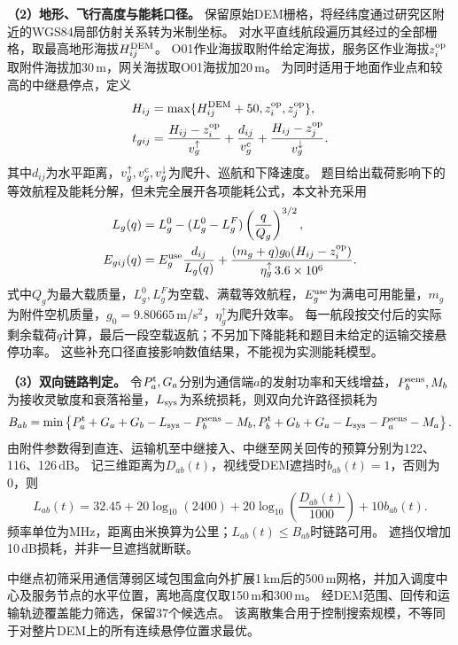 \textbf{（2）地形、飞行高度与能耗口径。}
保留原始DEM栅格，将经纬度通过研究区附近的WGS84局部仿射关系转为米制坐标。
对水平直线航段遍历其经过的全部栅格，取最高地形海拔$H^{\rm DEM}_{ij}$。
O01作业海拔取附件给定海拔，服务区作业海拔$z_i^{\rm op}$取附件海拔加30\,m，网关海拔取O01海拔加20\,m。
为同时适用于地面作业点和较高的中继悬停点，定义
\begin{align}
  H_{ij}&=\max\{H^{\rm DEM}_{ij}+50,z_i^{\rm op},z_j^{\rm op}\},
  \label{eq:q3:height}\\
  t_{gij}&=\frac{H_{ij}-z_i^{\rm op}}{v_g^{\uparrow}}
           +\frac{d_{ij}}{v_g^{\rm c}}
           +\frac{H_{ij}-z_j^{\rm op}}{v_g^{\downarrow}}.
  \label{eq:q3:flight-time}
\end{align}
其中$d_{ij}$为水平距离，$v_g^{\uparrow},v_g^{\rm c},v_g^{\downarrow}$为爬升、巡航和下降速度。
题目给出载荷影响下的等效航程及能耗分解，但未完全展开各项能耗公式，本文补充采用
\begin{align}
  L_g(q)&=L_g^0-(L_g^0-L_g^F)\left(\frac{q}{Q_g}\right)^{3/2},
  \label{eq:q3:range}\\
  E_{gij}(q)&=E_g^{\rm use}\frac{d_{ij}}{L_g(q)}
    +\frac{(m_g+q)g_0(H_{ij}-z_i^{\rm op})}{\eta_g^{\uparrow}\,3.6\times10^6}.
  \label{eq:q3:energy}
\end{align}
式中$Q_g$为最大载质量，$L_g^0,L_g^F$为空载、满载等效航程，$E_g^{\rm use}$为满电可用能量，$m_g$为附件空机质量，$g_0=9.80665$\,m/s$^2$，$\eta_g^{\uparrow}$为爬升效率。
每一航段按交付后的实际剩余载荷$q$计算，最后一段空载返航；不另加下降能耗和题目未给定的运输交接悬停功率。
这些补充口径直接影响数值结果，不能视为实测能耗模型。

\textbf{（3）双向链路判定。}
令$P_a^{\rm t},G_a$分别为通信端$a$的发射功率和天线增益，$P_b^{\rm sens},M_b$为接收灵敏度和衰落裕量，$L_{\rm sys}$为系统损耗，则双向允许路径损耗为
\begin{equation}
  B_{ab}=\min\left\{
    P_a^{\rm t}+G_a+G_b-L_{\rm sys}-P_b^{\rm sens}-M_b,
    P_b^{\rm t}+G_b+G_a-L_{\rm sys}-P_a^{\rm sens}-M_a
  \right\}.
  \label{eq:q3:budget}
\end{equation}
由附件参数得到直连、运输机至中继接入、中继至网关回传的预算分别为122、116、126\,dB。
记三维距离为$D_{ab}(t)$，视线受DEM遮挡时$b_{ab}(t)=1$，否则为0，则
\begin{equation}
  L_{ab}(t)=32.45+20\log_{10}(2400)
    +20\log_{10}\!\left(\frac{D_{ab}(t)}{1000}\right)+10b_{ab}(t).
  \label{eq:q3:path-loss}
\end{equation}
频率单位为MHz，距离由米换算为公里；$L_{ab}(t)\le B_{ab}$时链路可用。
遮挡仅增加10\,dB损耗，并非一旦遮挡就断联。

中继点初筛采用通信薄弱区域包围盒向外扩展1\,km后的500\,m网格，并加入调度中心及服务节点的水平位置，离地高度仅取150\,m和300\,m。
经DEM范围、回传和运输轨迹覆盖能力筛选，保留37个候选点。
该离散集合用于控制搜索规模，不等同于对整片DEM上的所有连续悬停位置求最优。

